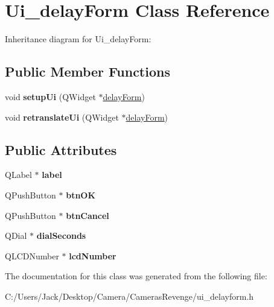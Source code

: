 \hypertarget{class_ui__delay_form}{\section{Ui\+\_\+delay\+Form Class Reference}
\label{class_ui__delay_form}
}


Inheritance diagram for Ui\+\_\+delay\+Form\+:
\subsection*{Public Member Functions}
\begin{DoxyCompactItemize}
\item 
\hypertarget{class_ui__delay_form_a13c7fbec090db893ed6343c803148d02}{void {\bfseries setup\+Ui} (Q\+Widget $\ast$\hyperlink{classdelay_form}{delay\+Form})}\label{class_ui__delay_form_a13c7fbec090db893ed6343c803148d02}

\item 
\hypertarget{class_ui__delay_form_a51e04d50fac0b1bee1211b432c65be03}{void {\bfseries retranslate\+Ui} (Q\+Widget $\ast$\hyperlink{classdelay_form}{delay\+Form})}\label{class_ui__delay_form_a51e04d50fac0b1bee1211b432c65be03}

\end{DoxyCompactItemize}
\subsection*{Public Attributes}
\begin{DoxyCompactItemize}
\item 
\hypertarget{class_ui__delay_form_a863c2bd3027442f795d024ac534789bb}{Q\+Label $\ast$ {\bfseries label}}\label{class_ui__delay_form_a863c2bd3027442f795d024ac534789bb}

\item 
\hypertarget{class_ui__delay_form_a7fe5d86abf156d664a3228d3906982d7}{Q\+Push\+Button $\ast$ {\bfseries btn\+O\+K}}\label{class_ui__delay_form_a7fe5d86abf156d664a3228d3906982d7}

\item 
\hypertarget{class_ui__delay_form_aedb7a3a3ec65b795c5325fbebb1d8fdc}{Q\+Push\+Button $\ast$ {\bfseries btn\+Cancel}}\label{class_ui__delay_form_aedb7a3a3ec65b795c5325fbebb1d8fdc}

\item 
\hypertarget{class_ui__delay_form_a171ba6b087740f52d37e98539f7b9644}{Q\+Dial $\ast$ {\bfseries dial\+Seconds}}\label{class_ui__delay_form_a171ba6b087740f52d37e98539f7b9644}

\item 
\hypertarget{class_ui__delay_form_a57fe52dc7e8dfd9c8c4a1b658475d2a9}{Q\+L\+C\+D\+Number $\ast$ {\bfseries lcd\+Number}}\label{class_ui__delay_form_a57fe52dc7e8dfd9c8c4a1b658475d2a9}

\end{DoxyCompactItemize}


The documentation for this class was generated from the following file\+:\begin{DoxyCompactItemize}
\item 
C\+:/\+Users/\+Jack/\+Desktop/\+Camera/\+Cameras\+Revenge/ui\+\_\+delayform.\+h\end{DoxyCompactItemize}
